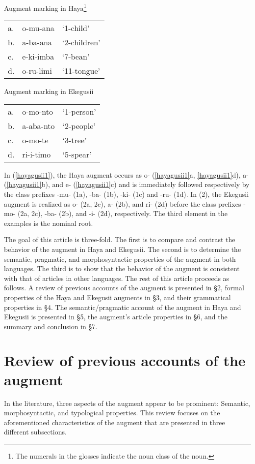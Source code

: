 \documentclass[output=paper]{langscibook}
\begin{document}
\ea
 Augment marking in Haya\footnote{The numerals in the glosses indicate the noun class of the noun.} \\
 \label{hayagusii1}
\begin{tabular}{p{0.5cm} p{3cm} p{3cm}}
    a. & o-mu-ana  &	‘1-child’  \\
    b.  & 	a-ba-ana  &	‘2-children’ \\
    c. & 	e-ki-imba  &	‘7-bean’ \\
    d. & 	o-ru-limi &	‘11-tongue’ \\
\end{tabular}
\ex Augment marking in Ekegusii\\
\label{hayagusii2}
\begin{tabular}{p{0.5cm} p{3cm} p{3cm}}
    a. & o-mo-nto &	‘1-person’  \\
    b.  & a-aba-nto	& ‘2-people’ \\
    c. & o-mo-te	&	‘3-tree’ \\
    d. & ri-i-timo	&	‘5-spear’ \\
\end{tabular}
\z
In (\ref{hayagusii1}), the Haya augment occurs as o- (\ref{hayagusii1}a, \ref{hayagusii1}d), a- (\ref{hayagusii1}b), and e- (\ref{hayagusii1}c) and is immediately followed respectively by the class prefixes -mu- (1a), -ba- (1b), -ki- (1c) and -ru- (1d). In (2), the Ekegusii augment is realized as o- (2a, 2c), a- (2b), and ri- (2d) before the class prefixes -mo- (2a, 2c), -ba- (2b), and -i- (2d), respectively. The third element in the examples is the nominal root.

The goal of this article is three-fold. The first is to compare and contrast the behavior of the augment in Haya and Ekegusii. The second is to determine the semantic, pragmatic, and morphosyntactic properties of the augment in both languages. The third is to show that the behavior of the augment is consistent with that of articles in other languages. The rest of this article proceeds as follows. A review of previous accounts of the augment is presented in §2, formal properties of the Haya and Ekegusii augments in §3, and their grammatical properties in §4. The semantic/pragmatic account of the augment in Haya and Ekegusii is presented in §5, the augment’s article properties in §6, and the summary and conclusion in §7.

\section{Review of previous accounts of the augment}
In the literature, three aspects of the augment appear to be prominent: Semantic, morphosyntactic, and typological properties. This review focuses on the aforementioned characteristics of the augment that are presented in three different subsections.
\end{document}
